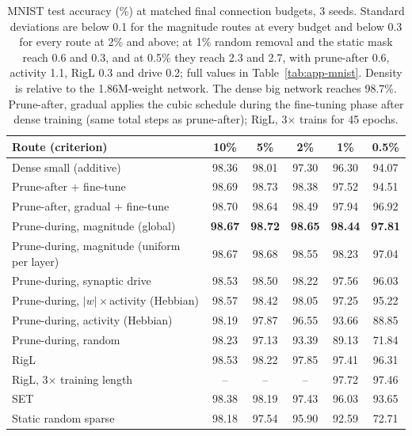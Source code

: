 \documentclass[11pt]{article}
\begin{document}
\begin{table}[t]
\centering\small
\caption{MNIST test accuracy (\%) at matched final connection budgets, 3 seeds. Standard deviations are below 0.1 for the
magnitude routes at every budget and below 0.3 for every route at 2\% and above; at 1\% random removal and the static mask
reach 0.6 and 0.3, and at 0.5\% they reach 2.3 and 2.7, with prune-after 0.6, activity 1.1, RigL 0.3 and drive 0.2; full
values in Table~\ref{tab:app-mnist}. Density is relative to the 1.86M-weight
network. The dense big network reaches 98.7\%. Prune-after, gradual applies the cubic schedule during the fine-tuning phase
after dense training (same total steps as prune-after); RigL, 3$\times$ trains for 45 epochs.}
\label{tab:mnist}
\begin{tabular}{lccccc}
\toprule
Route (criterion) & 10\% & 5\% & 2\% & 1\% & 0.5\% \\
\midrule
Dense small (additive)           & 98.36 & 98.01 & 97.30 & 96.30 & 94.07 \\
Prune-after + fine-tune          & 98.69 & 98.73 & 98.38 & 97.52 & 94.51 \\
Prune-after, gradual + fine-tune & 98.70 & 98.64 & 98.49 & 97.94 & 96.92 \\
Prune-during, magnitude (global) & \textbf{98.67} & \textbf{98.72} & \textbf{98.65} & \textbf{98.44} & \textbf{97.81} \\
Prune-during, magnitude (uniform per layer) & 98.67 & 98.68 & 98.55 & 98.23 & 97.04 \\
Prune-during, synaptic drive     & 98.53 & 98.50 & 98.22 & 97.56 & 96.03 \\
Prune-during, $|w|\times$activity (Hebbian) & 98.57 & 98.42 & 98.05 & 97.25 & 95.22 \\
Prune-during, activity (Hebbian)  & 98.19 & 97.87 & 96.55 & 93.66 & 88.85 \\
Prune-during, random             & 98.23 & 97.13 & 93.39 & 89.13 & 71.84 \\
RigL                             & 98.53 & 98.22 & 97.85 & 97.41 & 96.31 \\
RigL, 3$\times$ training length   & --    & --    & --    & 97.72 & 97.46 \\
SET                              & 98.38 & 98.19 & 97.43 & 96.03 & 93.65 \\
Static random sparse             & 98.18 & 97.54 & 95.90 & 92.59 & 72.71 \\
\bottomrule
\end{tabular}
\end{table}
\end{document}
